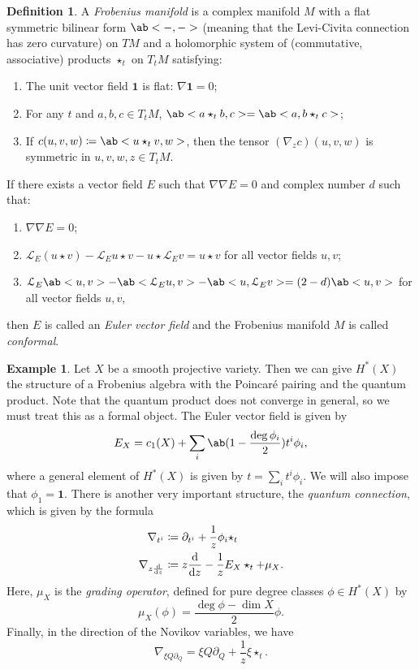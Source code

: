 \documentclass[leqno, openany]{memoir}
\theoremstyle{definition}
\newtheorem{defn}[thm]{Definition}
\newtheorem{exm}[thm]{Example}
\theoremstyle{remark}
\theoremstyle{plain}
\theoremstyle{definition}
\theoremstyle{remark}
\newcommand{\mc}[1]{\mathcal{#1}}
\newcommand{\mbf}[1]{\mathbf{#1}}
\begin{document}
\begin{defn}
    A \textit{Frobenius manifold} is a complex manifold $M$ with a flat symmetric bilinear form $\ab<-,->$ (meaning that the Levi-Civita connection has zero curvature) on $TM$ and a holomorphic system of (commutative, associative) products $\star_t$ on $T_t M$ satisfying:
    \begin{enumerate}
        \item The unit vector field $\mbf{1}$ is flat: $\nabla \mbf{1} = 0$;
        \item For any $t$ and $a,b,c \in T_t M$, $\ab<a \star_t b, c> = \ab<a, b \star_t c>$;
        \item If $c(u,v,w) \coloneqq \ab<u \star_t v, w>$, then the tensor $(\nabla_z c)(u,v,w)$ is symmetric in $u,v,w,z \in T_t M$.
    \end{enumerate}
    If there exists a vector field $E$ such that $\nabla \nabla E = 0$ and complex number $d$ such that:
    \begin{enumerate}
        \item $\nabla \nabla E = 0$;
        \item $\mc{L}_E(u \star v) - \mc{L}_E u \star v - u \star \mc{L}_E v = u \star v$ for all vector fields $u,v$;
        \item $\mc{L}_E \ab<u,v> - \ab<\mc{L}_E u,v> - \ab<u,\mc{L}_E v> = (2-d) \ab<u,v>$ for all vector fields $u,v$,
    \end{enumerate}
    then $E$ is called an \textit{Euler vector field} and the Frobenius manifold $M$ is called \textit{conformal}.
\end{defn}

\begin{exm}
    Let $X$ be a smooth projective variety. Then we can give $H^*(X)$ the structure of a Frobenius algebra with the Poincar\'e pairing and the quantum product. Note that the quantum product does not converge in general, so we must treat this as a formal object. The Euler vector field is given by
    \[ E_X = c_1(X) + \sum_i \ab(1-\frac{\deg \phi_i}{2})t^i \phi_i, \]
    where a general element of $H^*(X)$ is given by $t = \sum_i t^i \phi_i$. We will also impose that $\phi_1 = \mbf{1}$. There is another very important structure, the \textit{quantum connection}, which is given by the formula
    \begin{align*}
        \nabla_{t^i} &\coloneqq \partial_{t^i} + \frac{1}{z} \phi_i \star_t \\
        \nabla_{z \odv{}{z}} &\coloneqq z \odv{}{z} - \frac{1}{z} E_X \star_t + \mu_X.
    \end{align*}
    Here, $\mu_X$ is the \textit{grading operator}, defined for pure degree classes $\phi \in H^*(X)$ by
    \[ \mu_X(\phi) = \frac{\deg \phi - \dim X}{2} \phi. \]
    Finally, in the direction of the Novikov variables, we have
    \[ \nabla_{\xi Q \partial_Q} = \xi Q \partial_Q + \frac{1}{z} \xi \star_t. \]
\end{exm}
\end{document}
